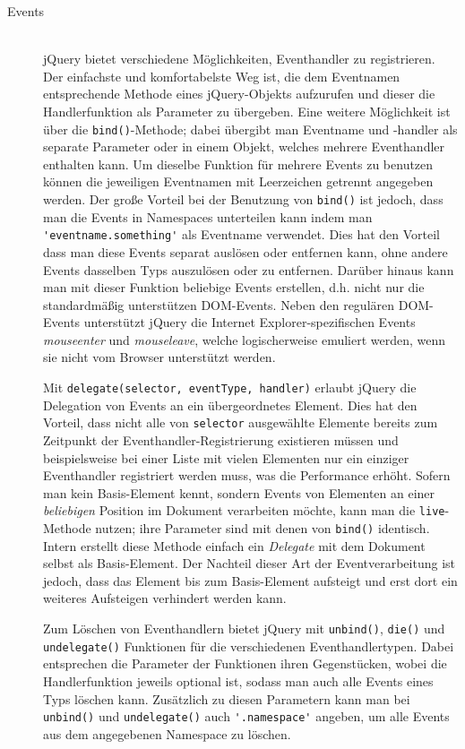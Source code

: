 \begin{description}
\item[Events] \hfill \\
jQuery bietet verschiedene Möglichkeiten, Eventhandler zu registrieren. Der einfachste und
komfortabelste Weg ist, die dem Eventnamen entsprechende Methode eines jQuery-Objekts aufzurufen und
dieser die Handlerfunktion als Parameter zu übergeben. Eine weitere Möglichkeit ist über die
\lstinline{bind()}-Methode; dabei übergibt man Eventname und -handler als separate Parameter oder in
einem Objekt, welches mehrere Eventhandler enthalten kann. Um dieselbe Funktion für mehrere Events
zu benutzen können die jeweiligen Eventnamen mit Leerzeichen getrennt angegeben werden. Der große
Vorteil bei der Benutzung von \lstinline{bind()} ist jedoch, dass man die Events in Namespaces
unterteilen kann indem man \lstinline{'eventname.something'} als Eventname verwendet. Dies hat den
Vorteil dass man diese Events separat auslösen oder entfernen kann, ohne andere Events dasselben
Typs auszulösen oder zu entfernen. Darüber hinaus kann man mit dieser Funktion beliebige Events
erstellen, d.h. nicht nur die standardmäßig unterstützen DOM-Events. Neben den regulären DOM-Events
unterstützt jQuery die Internet Explorer-spezifischen Events \emph{mouseenter} und
\emph{mouseleave}, welche logischerweise emuliert werden, wenn sie nicht vom Browser unterstützt
werden.

Mit \lstinline{delegate(selector, eventType, handler)} erlaubt jQuery die Delegation von Events an
ein übergeordnetes Element. Dies hat den Vorteil, dass nicht alle von \lstinline{selector}
ausgewählte Elemente bereits zum Zeitpunkt der Eventhandler-Registrierung existieren müssen und
beispielsweise bei einer Liste mit vielen Elementen nur ein einziger Eventhandler registriert werden
muss, was die Performance erhöht. Sofern man kein Basis-Element kennt, sondern Events von Elementen
an einer \emph{beliebigen} Position im Dokument verarbeiten möchte, kann man die
\lstinline{live}-Methode nutzen; ihre Parameter sind mit denen von \lstinline{bind()} identisch.
Intern erstellt diese Methode einfach ein \emph{Delegate} mit dem Dokument selbst als Basis-Element.
Der Nachteil dieser Art der Eventverarbeitung ist jedoch, dass das Element bis zum Basis-Element
aufsteigt und erst dort ein weiteres Aufsteigen verhindert werden kann.

Zum Löschen von Eventhandlern bietet jQuery mit \lstinline{unbind()}, \lstinline{die()} und
\lstinline{undelegate()} Funktionen für die verschiedenen Eventhandlertypen. Dabei entsprechen die
Parameter der Funktionen ihren Gegenstücken, wobei die Handlerfunktion jeweils optional ist, sodass
man auch alle Events eines Typs löschen kann. Zusätzlich zu diesen Parametern kann man bei
\lstinline{unbind()} und \lstinline{undelegate()} auch \lstinline{'.namespace'} angeben, um alle
Events aus dem angegebenen Namespace zu löschen.


\end{description}

